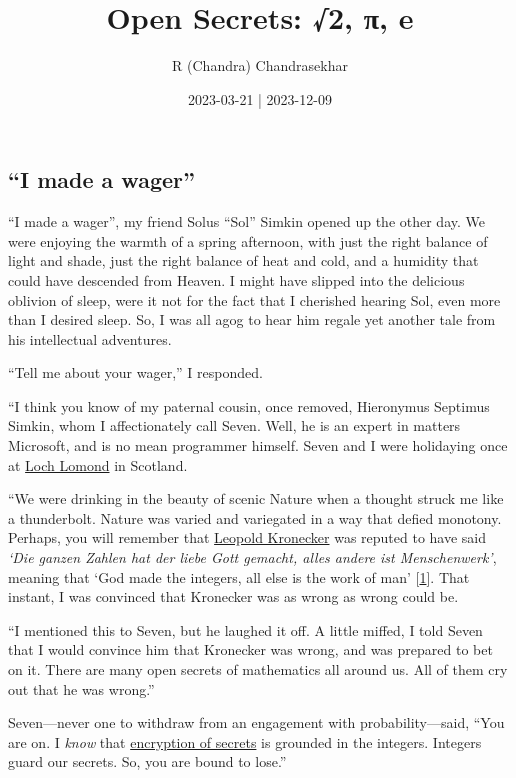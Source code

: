 \documentclass[
  a4paper,
]{article}
\title{Open Secrets: √2, π, e}
\author{R (Chandra) Chandrasekhar}
\date{2023-03-21 | 2023-12-09}
\begin{document}
\maketitle

\thispagestyle{empty}


\hypertarget{i-made-a-wager}{%
\subsection{``I made a wager''}\label{i-made-a-wager}}

``I made a wager'', my friend Solus ``Sol'' Simkin opened up the other
day. We were enjoying the warmth of a spring afternoon, with just the
right balance of light and shade, just the right balance of heat and
cold, and a humidity that could have descended from Heaven. I might have
slipped into the delicious oblivion of sleep, were it not for the fact
that I cherished hearing Sol, even more than I desired sleep. So, I was
all agog to hear him regale yet another tale from his intellectual
adventures.

``Tell me about your wager,'' I responded.

``I think you know of my paternal cousin, once removed, Hieronymus
Septimus Simkin, whom I affectionately call Seven. Well, he is an expert
in matters Microsoft, and is no mean programmer himself. Seven and I
were holidaying once at
\href{https://www.nationalparks.uk/park/loch-lomond-the-trossachs/}{Loch
Lomond} in Scotland.

``We were drinking in the beauty of scenic Nature when a thought struck
me like a thunderbolt. Nature was varied and variegated in a way that
defied monotony. Perhaps, you will remember that
\href{https://en.wikipedia.org/wiki/Leopold_Kronecker}{Leopold
Kronecker} was reputed to have said \emph{`Die ganzen Zahlen hat der
liebe Gott gemacht, alles andere ist Menschenwerk'}, meaning that `God
made the integers, all else is the work of man'
{[}\protect\hyperlink{ref-kronecker}{1}{]}. That instant, I was
convinced that Kronecker was as wrong as wrong could be.

``I mentioned this to Seven, but he laughed it off. A little miffed, I
told Seven that I would convince him that Kronecker was wrong, and was
prepared to bet on it. There are many open secrets of mathematics all
around us. All of them cry out that he was wrong.''

Seven---never one to withdraw from an engagement with
probability---said, ``You are on. I \emph{know} that
\href{https://cloud.google.com/learn/what-is-encryption}{encryption of
secrets} is grounded in the integers. Integers guard our secrets. So,
you are bound to lose.''
\end{document}
